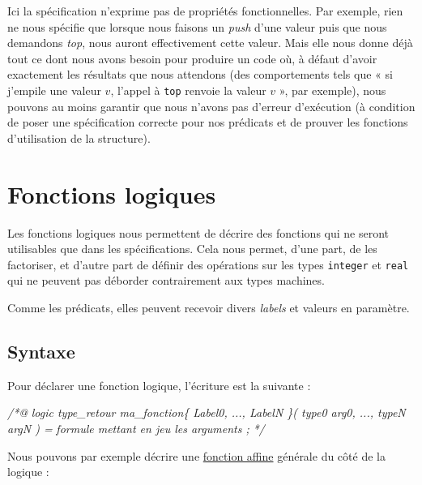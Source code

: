 \documentclass[12pt,francais,]{scrbook}
\newenvironment{Shaded}{}{}
\newcommand{\CommentTok}[1]{\textcolor[rgb]{0.38,0.63,0.69}{\textit{{#1}}}}
\begin{document}
Ici la spécification n'exprime pas de propriétés fonctionnelles. Par
exemple, rien ne nous spécifie que lorsque nous faisons un \emph{push}
d'une valeur puis que nous demandons \emph{top}, nous auront
effectivement cette valeur. Mais elle nous donne déjà tout ce dont nous
avons besoin pour produire un code où, à défaut d'avoir exactement les
résultats que nous attendons (des comportements tels que « si j'empile
une valeur \(v\), l'appel à \texttt{top} renvoie la valeur \(v\) », par
exemple), nous pouvons au moins garantir que nous n'avons pas d'erreur
d'exécution (à condition de poser une spécification correcte pour nos
prédicats et de prouver les fonctions d'utilisation de la structure).

\section{Fonctions logiques}\label{fonctions-logiques}

Les fonctions logiques nous permettent de décrire des fonctions qui ne
seront utilisables que dans les spécifications. Cela nous permet, d'une
part, de les factoriser, et d'autre part de définir des opérations sur
les types \texttt{integer} et \texttt{real} qui ne peuvent pas déborder
contrairement aux types machines.

Comme les prédicats, elles peuvent recevoir divers \emph{labels} et
valeurs en paramètre.

\clearpage

\subsection{Syntaxe}\label{syntaxe-1}

Pour déclarer une fonction logique, l'écriture est la suivante :

\begin{footnotesize}\begin{Shaded}
\begin{Highlighting}[]
\CommentTok{/*@}
\CommentTok{  logic type_retour ma_fonction\{ Label0, ..., LabelN \}( type0 arg0, ..., typeN argN ) =}
\CommentTok{    formule mettant en jeu les arguments ;}
\CommentTok{*/}
\end{Highlighting}
\end{Shaded}\end{footnotesize}

Nous pouvons par exemple décrire une
\href{https://fr.wikipedia.org/wiki/Fonction_affine}{fonction affine}
générale du côté de la logique :
\end{document}
